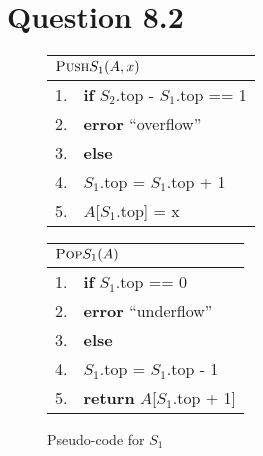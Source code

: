 \documentclass[a4paper,12pt]{article}
\begin{document}
\section*{Question 8.2}

\begin{figure}[H]
	\begin{minipage}{0.5\textwidth}
		\centering
		\begin{tabular}{ll}
			\toprule
			\multicolumn{2}{l}{$\textsc{Push}S_1(A,x)$} \\
			\midrule
			1. & \textbf{if} $S_2$.top - $S_1$.top == 1 \\
			2. & \quad \textbf{error} ``overflow'' \\
			3. & \textbf{else} \\
			4. & \quad $S_1$.top = $S_1$.top + 1 \\
			5. & \quad $A$[$S_1$.top] = x \\
			\bottomrule
		\end{tabular}
	\end{minipage}
	\begin{minipage}{0.5\textwidth}
		\centering
		\begin{tabular}{ll}
			\toprule
			\multicolumn{2}{l}{$\textsc{Pop}S_1(A)$} \\
			\midrule
			1. & \textbf{if} $S_1$.top == 0 \\
			2. & \quad \textbf{error} ``underflow'' \\
			3. & \textbf{else} \\
			4. & \quad $S_1$.top = $S_1$.top - 1 \\
			5. & \quad \textbf{return} $A$[$S_1$.top + 1] \\
			\bottomrule
		\end{tabular}
	\end{minipage}
	\caption*{Pseudo-code for $S_1$}
\end{figure}
\end{document}
